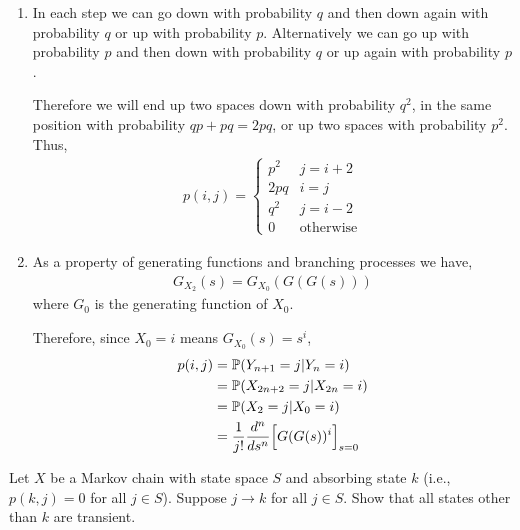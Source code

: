 \begin{solution}[Solution]
\begin{enumerate}[label=(\alph*)]
    \item
        In each step we can go down with probability \( q \) and then down again with probability \( q \) or up with probability \( p \). Alternatively we can go up with probability \( p \) and then down with probability \( q \) or up again with probability \( p \). 

        Therefore we will end up two spaces down with probability \( q^2 \), in the same position with probability \( qp+pq = 2pq \), or up two spaces with probability \( p^2 \). Thus,
        \begin{align*}
            p(i,j) = \begin{cases} p^2 & j=i+2 \\ 2pq & i=j \\ q^2 & j=i-2 \\ 0 & \text{otherwise}\end{cases} 
        \end{align*}
    \item
        As a property of generating functions and branching processes we have,
        \begin{align*}
            G_{X_2}(s) 
            = G_{X_0}(G(G(s)))
        \end{align*}
        where \( G_0 \) is the generating function of \( X_0 \).

        Therefore, since \( X_0 = i \) means \( G_{X_0}(s) = s^i \),
        \begin{align*}
            p(i,j) 
            &= \mathbb{P}(Y_{n+1} = j | Y_n = i)
            \\&= \mathbb{P}(X_{2n+2} = j | X_{2n} =i)
            \\&= \mathbb{P}(X_2 = j | X_0 = i)
            \\&= \dfrac{1}{j!} \dfrac{d^n}{ds^n}\Big[ G(G(s))^i \Big]_{s=0}
        \end{align*}
\end{enumerate}
\end{solution}

\begin{problem}[Exercise 4.3]
Let \( X \) be a Markov chain with state space \( S \) and absorbing state \( k \) (i.e., \( p(k, j) = 0 \) for all \( j \in S \)). Suppose \( j\rightarrow k\) for all \( j\in S \). Show that all states other than \( k \) are transient.
\end{problem}

